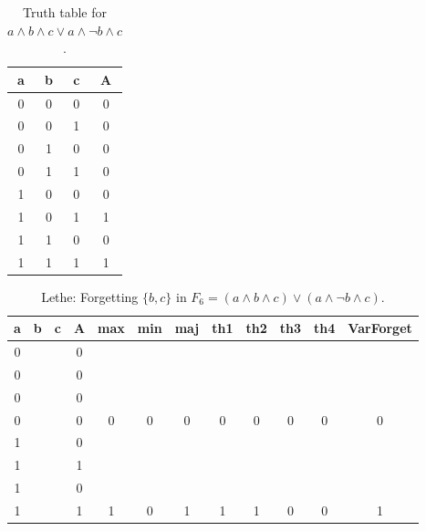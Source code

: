 \begin{table}[!tb]
    \centering
    \begin{tabular}{|c|c|c|c|}
        \hline
        \textbf{a} & \textbf{b} & \textbf{c} & \textbf{A} \\ \hline
        0 & 0 & 0 & 0 \\ \hline
        0 & 0 & 1 & 0 \\ \hline
        0 & 1 & 0 & 0 \\ \hline
        0 & 1 & 1 & 0 \\ \hline
        1 & 0 & 0 & 0 \\ \hline
        1 & 0 & 1 & 1 \\ \hline
        1 & 1 & 0 & 0 \\ \hline
        1 & 1 & 1 & 1 \\ \hline
    \end{tabular}
    \caption{Truth table for $a \land b \land c \lor a \land \lnot b \land c$.}
    \label{tab:truthtab}
\end{table}

\begin{table}[!tb]
    \centering
    \begin{tabular}{|c|c|c|c|c|c|c|c|c|c|c|c|}
        \hline
        \textbf{a} & \textbf{b} & \textbf{c} & \textbf{A} & \textbf{max} & \textbf{min} & \textbf{maj} & \textbf{th1} & \textbf{th2} & \textbf{th3} & \textbf{th4} & \textbf{VarForget} \\ \hline
        \rowcolor{gray!40} 0 &  &  & 0 &  &  &  &  &  &  &  &  \\ \hline
        \rowcolor{gray!40} 0 &  &  & 0 &  &  &  &  &  &  &  &  \\ \hline
        \rowcolor{gray!40} 0 &  &  & 0 &  &  &  &  &  &  &  &  \\ \hline
        \rowcolor{gray!40} 0 &  &  & 0 & 0 & 0 & 0 & 0 & 0 & 0 & 0 & 0 \\ \hline
        \rowcolor{blue!40} 1 &  &  & 0 &  &  &  &  &  &  &  &  \\ \hline
        \rowcolor{blue!40} 1 &  &  & 1 &  &  &  &  &  &  &  &  \\ \hline
        \rowcolor{blue!40} 1 &  &  & 0 &  &  &  &  &  &  &  &  \\ \hline
        \rowcolor{blue!40} 1 &  &  & 1 & 1 & 0 & 1 & 1 & 1 & 0 & 0 & 1 \\ \hline
    \end{tabular}
    \caption{Lethe: Forgetting $\{b, c\}$ in $F_{6} = (a \land b \land c) \lor (a \land \lnot b \land c)$.}
    \label{tab:lethe-F6-bc}
\end{table}
